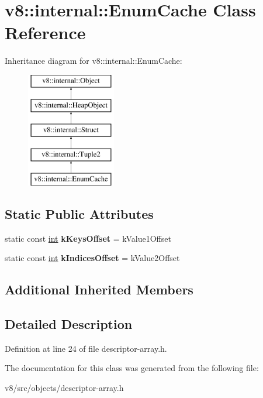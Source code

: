 \hypertarget{classv8_1_1internal_1_1EnumCache}{}\section{v8\+:\+:internal\+:\+:Enum\+Cache Class Reference}
\label{classv8_1_1internal_1_1EnumCache}
Inheritance diagram for v8\+:\+:internal\+:\+:Enum\+Cache\+:\begin{figure}[H]
\begin{center}
\leavevmode
\includegraphics[height=5.000000cm]{classv8_1_1internal_1_1EnumCache}
\end{center}
\end{figure}
\subsection*{Static Public Attributes}
\begin{DoxyCompactItemize}
\item 
\mbox{\label{classv8_1_1internal_1_1EnumCache_a9d45c872d3e15e712aad70513096ec91}} 
static const \mbox{\hyperlink{classint}{int}} {\bfseries k\+Keys\+Offset} = k\+Value1\+Offset
\item 
\mbox{\label{classv8_1_1internal_1_1EnumCache_a7fcfbc3dc02619d85594bbce0e4c7e53}} 
static const \mbox{\hyperlink{classint}{int}} {\bfseries k\+Indices\+Offset} = k\+Value2\+Offset
\end{DoxyCompactItemize}
\subsection*{Additional Inherited Members}


\subsection{Detailed Description}


Definition at line 24 of file descriptor-\/array.\+h.



The documentation for this class was generated from the following file\+:\begin{DoxyCompactItemize}
\item 
v8/src/objects/descriptor-\/array.\+h\end{DoxyCompactItemize}
